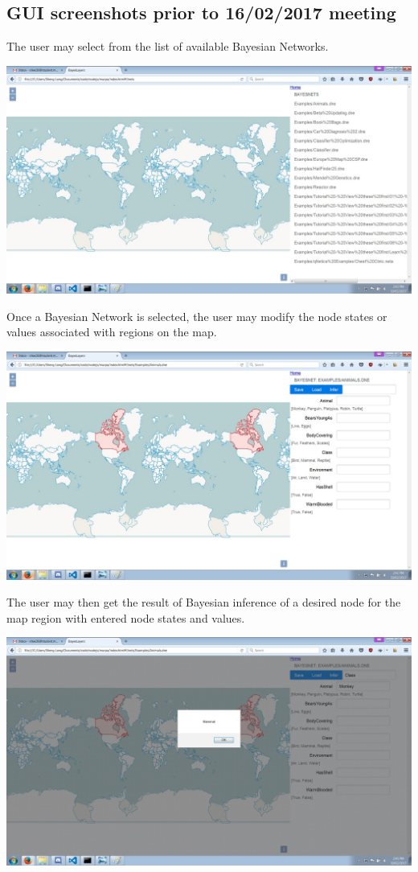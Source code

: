 \documentclass[12pt,notitlepage]{article}
\begin{document}
\subsection{GUI screenshots prior to 16/02/2017 meeting}\label{subsec:screens0}
The user may select from the list of available Bayesian Networks.
\begin{center}
\includegraphics[width=0.8\linewidth]{v0nets}
\end{center}
Once a Bayesian Network is selected, the user may modify the node states or values associated with regions on the map.
\begin{center}
\includegraphics[width=0.8\linewidth]{v0nodes}
\end{center}
\clearpage
\noindent The user may then get the result of Bayesian inference of a desired node for the map region with entered node states and values.
\begin{center}
\includegraphics[width=0.8\linewidth]{v0infer}
\end{center}
\end{document}
